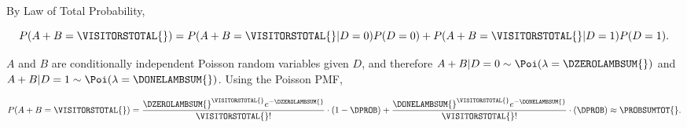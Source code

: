 By Law of Total Probability,

\[ P(A + B = \VISITORSTOTAL{}) = P(A + B = \VISITORSTOTAL{} | D = 0) P(D = 0) + P(A + B = \VISITORSTOTAL{} | D = 1) P(D = 1). \]

$A$ and $B$ are conditionally independent Poisson random variables given $D$, and therefore $A + B | D = 0 \sim\Poi(\lambda = \DZEROLAMBSUM{})$ and $A + B | D = 1 \sim\Poi(\lambda = \DONELAMBSUM{})$. Using the Poisson PMF,

\[
P(A + B = \VISITORSTOTAL{}) = \frac{\DZEROLAMBSUM{}^{\VISITORSTOTAL{}} e^{-\DZEROLAMBSUM{}}}{\VISITORSTOTAL{}!} \cdot (1 - \DPROB) + \frac{\DONELAMBSUM{}^{\VISITORSTOTAL{}} e^{-\DONELAMBSUM{}}}{\VISITORSTOTAL{}!} \cdot (\DPROB) \approx \PROBSUMTOT{}.
\]